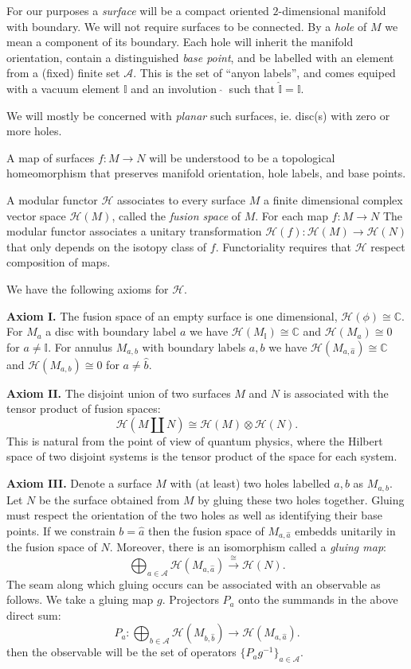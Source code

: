 \documentclass[aps, prl, letterpaper, twocolumn, superscriptaddress, notitlepage, 10pt]{revtex4-1}
\newcommand{\vac}{\mathbb{I}}
\newcommand{\F}{\mathscr{H}} %
\newcommand{\C}{\mathbb{C}}
\newcommand{\A}{\mathcal{A}}
\begin{document}
For our purposes a \emph{surface} will be a compact
oriented $2$-dimensional manifold with boundary. %
We will not require surfaces to be connected.
By a \emph{hole} of $M$ we mean a component of its boundary. %
Each hole will inherit the manifold orientation,
contain a distinguished \emph{base point},
and be labelled with
an element from a (fixed) finite set $\A.$
This is the set of ``anyon labels'', and comes
equiped with a vacuum element $\vac$ 
and an involution $\ \widehat{}\ $ such that $\widehat{\vac}=\vac.$

We will mostly be concerned with \emph{planar} such
surfaces, ie. disc(s) with zero or more holes.

A map of surfaces $f:M\to N$ will be understood to be
a topological homeomorphism that preserves
manifold orientation, hole labels, and base points.

A modular functor $\F$ associates to every
surface $M$ a finite dimensional complex
vector space $\F(M)$, called the \emph{fusion space} of $M$.
For each map $f:M\to N$
The modular functor associates a
unitary transformation $\F(f) : \F(M)\to\F(N)$
that only depends on the isotopy class of $f.$
Functoriality requires that $\F$
respect composition of maps.

We have the following axioms for $\F.$

{\bf Axiom I.}
The fusion space of an empty surface is one dimensional, 
$\F(\phi) \cong \C.$ %
For $M_a$ a disc with boundary label $a$ we have
$\F(M_\vac)\cong \C$ and 
$\F(M_a)\cong 0$ for $a\ne \vac.$
For annulus $M_{a,b}$ with boundary labels
$a, b$ we have
$\F(M_{a,\widehat{a}})\cong \C$ and 
$\F(M_{a,b})\cong 0$ for $a\ne \widehat{b}.$

{\bf Axiom II.}
The disjoint union of two surfaces $M$ and $N$ 
is associated with
the tensor product of fusion spaces:
$$
    \F(M\amalg N) \cong \F(M)\otimes \F(N).
$$
This is natural from the point of view of quantum
physics, where the Hilbert space of two disjoint
systems is the tensor product of the space for
each system.

{\bf Axiom III.}
Denote a surface $M$ with (at least) two holes
labelled $a, b$ as $M_{a,b}$. 
Let $N$ be the surface obtained from $M$ by gluing
these two holes together.
Gluing must respect the orientation of the two holes
as well as identifying their base points.
If we constrain $b=\widehat{a}$ then the fusion space
of $M_{a,\widehat{a}}$ embedds unitarily in the fusion
space of $N.$ Moreover, there is an isomorphism called
a \emph{gluing map}:
$$
    \bigoplus_{a\in\A} \F(M_{a,\widehat{a}}) \xrightarrow{\cong} \F(N).
$$
The seam along which gluing occurs can be associated
with an observable as follows.
We take a gluing map $g$. Projectors $P_a$ onto the
summands in the above direct sum:
$$
    P_a: \bigoplus_{b\in\A} \F(M_{b,\widehat{b}}) \to \F(M_{a,\widehat{a}}).
$$
then the observable will be the set of operators $\{P_a g^{-1}\}_{a\in\A}.$
\end{document}
